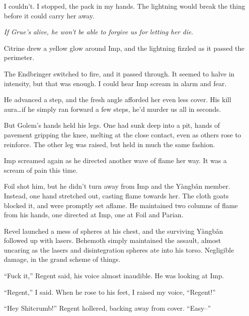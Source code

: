 I couldn't.  I stopped, the pack in my hands.  The lightning would break the thing before it could carry her away.



\emph{If Grue's alive, he won't be able to forgive us for }\emph{letting her die}.



Citrine drew a yellow glow around Imp, and the lightning fizzled as it passed the perimeter.



The Endbringer switched to fire, and it passed through.  It seemed to halve in intensity, but that was enough.  I could hear Imp scream in alarm and fear.



He advanced a step, and the fresh angle afforded her even less cover.  His kill aura\ldots if he simply ran forward a few steps, he'd murder us all in seconds.



But Golem's hands held his legs.  One had sunk deep into a pit, hands of pavement gripping the knee, melting at the close contact, even as others rose to reinforce.  The other leg was raised, but held in much the same fashion.



Imp screamed again as he directed another wave of flame her way.  It was a scream of pain this time.



Foil shot him, but he didn't turn away from Imp and the Y\`{a}ngb\v{a}n member.  Instead, one hand stretched out, casting flame towards her.  The cloth goats blocked it, and were promptly set aflame.  He maintained two columns of flame from his hands, one directed at Imp, one at Foil and Parian.



Revel launched a mess of spheres at his chest, and the surviving Y\`{a}ngb\v{a}n followed up with lasers.  Behemoth simply maintained the assault, almost uncaring as the lasers and disintegration spheres ate into his torso.  Negligible damage, in the grand scheme of things.



``Fuck it,'' Regent said, his voice almost inaudible.  He was looking at Imp.



``Regent,'' I said.  When he rose to his feet, I raised my voice, ``Regent!''



``Hey Shitcrumb!''  Regent hollered, backing away from cover.  ``Easy--''



